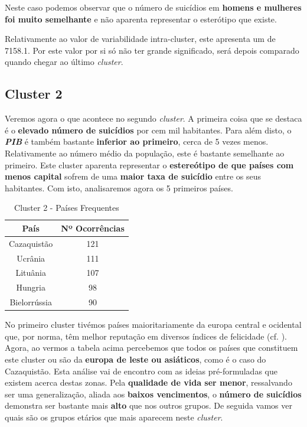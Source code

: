 \documentclass[a4paper,12pt]{article}
\begin{document}
Neste caso podemos observar que o número de suicídios em \textbf{homens e mulheres foi muito semelhante} e não aparenta representar o esterótipo que existe.

Relativamente ao valor de variabilidade intra-cluster, este apresenta um de 7158.1. Por este valor por si só não ter grande significado, será depois comparado quando chegar ao último \textit{cluster}.

\subsection{Cluster 2}
Veremos agora o que acontece no segundo \textit{cluster}. A primeira coisa que se destaca é o \textbf{elevado número de suicídios} por cem mil habitantes. Para além disto, o \textbf{\textit{PIB}} é também bastante \textbf{inferior ao primeiro}, cerca de 5 vezes menos. Relativamente ao número médio da população, este é bastante semelhante ao primeiro. Este cluster aparenta representar o \textbf{estereótipo de que países com menos capital} sofrem de uma \textbf{maior taxa de suicídio} entre os seus habitantes. Com isto, analisaremos agora os 5 primeiros países.

\begin{table}[H]
	\centering
	\caption{Cluster 2 - Países Frequentes}
	\begin{tabular}{|c|c|} 
		\hline
		\rowcolor[rgb]{0.678,1,0.851} País & Nº Ocorrências  \\ 
		\hline
		Cazaquistão                        & 121             \\ 
		\hline
		Ucrânia                            & 111             \\ 
		\hline
		Lituânia                           & 107             \\ 
		\hline
		Hungria                            & 98              \\ 
		\hline
		Bielorrússia                       & 90              \\
		\hline
	\end{tabular}
\end{table}

No primeiro cluster tivémos países maioritariamente da europa central e ocidental que, por norma, têm melhor reputação em diversos índices de felicidade (cf. \cite{indicefelicidade}).
Agora, ao vermos a tabela acima percebemos que todos os países que constituem este cluster ou são da \textbf{europa de leste ou asiáticos}, como é o caso do Cazaquistão. Esta análise vai de encontro com as ideias pré-formuladas que existem acerca destas zonas. Pela \textbf{qualidade de vida ser menor}, ressalvando ser uma generalização, aliada aos \textbf{baixos vencimentos}, o \textbf{número de suicídios} demonstra ser bastante mais \textbf{alto} que nos outros grupos.
De seguida vamos ver quais são os grupos etários que mais aparecem neste \textit{cluster}.
\end{document}
